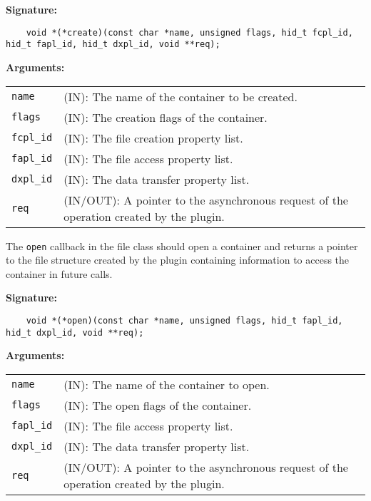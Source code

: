 \begin{mdframed}[style=bgbox]
\textbf{Signature:}
\begin{lstlisting}
    void *(*create)(const char *name, unsigned flags, hid_t fcpl_id, hid_t fapl_id, hid_t dxpl_id, void **req);
\end{lstlisting}

\textbf{Arguments:}\\
\begin{tabular}{l p{10cm}}
  \texttt{name} & (IN): The name of the container to be created.\\
  \texttt{flags} & (IN): The creation flags of the container.\\
  \texttt{fcpl\_id} & (IN): The file creation property list.\\
  \texttt{fapl\_id} & (IN): The file access property list.\\
  \texttt{dxpl\_id} & (IN): The data transfer property list.\\
  \texttt{req} & (IN/OUT): A pointer to the asynchronous request of the
  operation created by the plugin.\\
\end{tabular}
\end{mdframed}
\hspace*{\fill}
The \texttt{open} callback in the file class should open a container and
returns a pointer to the file structure created by the plugin containing information to
access the container in future calls.\bigskip

\begin{mdframed}[style=bgbox] 
\textbf{Signature:}
\begin{lstlisting}
    void *(*open)(const char *name, unsigned flags, hid_t fapl_id, hid_t dxpl_id, void **req);
\end{lstlisting}

\textbf{Arguments:}\\
\begin{tabular}{l p{10cm}}
  \texttt{name} & (IN): The name of the container to open.\\
  \texttt{flags} & (IN): The open flags of the container.\\
  \texttt{fapl\_id} & (IN): The file access property list.\\
  \texttt{dxpl\_id} & (IN): The data transfer property list.\\
  \texttt{req} & (IN/OUT): A pointer to the asynchronous request of the
  operation created by the plugin.\\
\end{tabular}
\end{mdframed}

